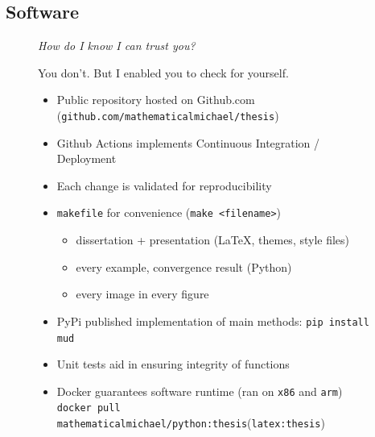 \subsection{Software}

\begin{frame}[t]
\centering
\begin{figure}
\centering

\emph{How do I know I can trust you?}

\vspace{0.25in}

You don't. But I enabled you to check for yourself.

\vspace{0.25in}

\begin{itemize}
	\item Public repository hosted on Github.com ({\tt github.com/mathematicalmichael/thesis})
	\item Github Actions implements Continuous Integration / Deployment
	\item Each change is validated for reproducibility
	\item {\tt makefile} for convenience ({\tt make <filename>})
	\begin{itemize}
		\item dissertation + presentation (\LaTeX, themes, style files)
		\item every example, convergence result (Python)
		\item every image in every figure
	\end{itemize}
	\item PyPi published implementation of main methods: {\tt pip install mud}
	\item Unit tests aid in ensuring integrity of functions
	\item Docker guarantees software runtime (ran on {\tt x86} and {\tt arm}) \\ {\tt docker pull mathematicalmichael/python:thesis}({\tt latex:thesis})
\end{itemize}

\end{figure}

\end{frame}

